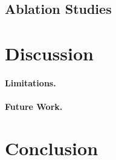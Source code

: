\subsection{Ablation Studies}

\section{Discussion}
\label{sec:discussion}

\paragraph{Limitations.}

\paragraph{Future Work.}

\section{Conclusion}
\label{sec:conclusion}

